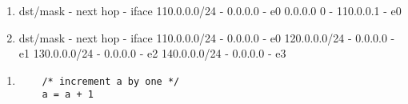 \documentclass[english]{arco-exam}
\begin{document}
\begin{questions}
\begin{simpleQuestion}[8]
  \begin{enumerate}[label=\alph*)]
  \item
  \begin{listing}[style=pre]
dst/mask     - next hop  - iface
110.0.0.0/24 -   0.0.0.0 - e0
0.0.0.0  0   - 110.0.0.1 - e0
\end{listing}

\item
  \begin{listing}[style=pre]
dst/mask     - next hop  - iface
110.0.0.0/24 -   0.0.0.0 - e0
120.0.0.0/24 -   0.0.0.0 - e1
130.0.0.0/24 -   0.0.0.0 - e2
140.0.0.0/24 -   0.0.0.0 - e3
\end{listing}
\end{enumerate}


\correctChoice{\mbox{}}
\choice{\mbox{}}
\end{simpleQuestion}

\end{questions}

\begin{enumerate}
\item
  \begin{lstlisting}
    /* increment a by one */
    a = a + 1
  \end{lstlisting}
\end{enumerate}
\end{document}
